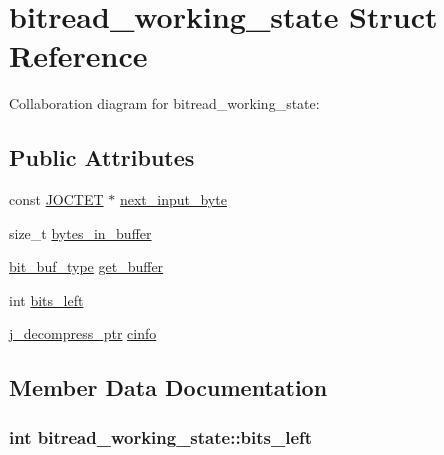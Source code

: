 \hypertarget{structbitread__working__state}{}\section{bitread\+\_\+working\+\_\+state Struct Reference}
\label{structbitread__working__state}


Collaboration diagram for bitread\+\_\+working\+\_\+state\+:
\subsection*{Public Attributes}
\begin{DoxyCompactItemize}
\item 
const \hyperlink{jmorecfg_8h_a356ad249f20e691b520da439f92cccbc}{J\+O\+C\+T\+E\+T} $\ast$ \hyperlink{structbitread__working__state_a663f17ba1c850439118605f1842b2fbf}{next\+\_\+input\+\_\+byte}
\item 
size\+\_\+t \hyperlink{structbitread__working__state_a9564d55e83f5b154a50a84ffb4e45809}{bytes\+\_\+in\+\_\+buffer}
\item 
\hyperlink{jdhuff_8c_ab2d47e546a8ed21c68e22f54535574a8}{bit\+\_\+buf\+\_\+type} \hyperlink{structbitread__working__state_a1b14cadab00deca48688b336c6a48664}{get\+\_\+buffer}
\item 
int \hyperlink{structbitread__working__state_a3744bcf2fb8bc73560ea6e4d083cf6ff}{bits\+\_\+left}
\item 
\hyperlink{jpeglib_8h_a00c7d78af44bd26a901c791ccfc1e178}{j\+\_\+decompress\+\_\+ptr} \hyperlink{structbitread__working__state_ae6ed0f717c279eac7ac54cec32cfaa3e}{cinfo}
\end{DoxyCompactItemize}


\subsection{Member Data Documentation}
\hypertarget{structbitread__working__state_a3744bcf2fb8bc73560ea6e4d083cf6ff}{}
\subsubsection[{bits\+\_\+left}]{\setlength{\rightskip}{0pt plus 5cm}int bitread\+\_\+working\+\_\+state\+::bits\+\_\+left}\label{structbitread__working__state_a3744bcf2fb8bc73560ea6e4d083cf6ff}
\hypertarget{structbitread__working__state_a9564d55e83f5b154a50a84ffb4e45809}{}
